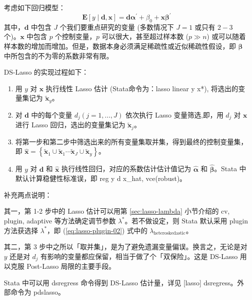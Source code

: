 考虑如下回归模型：
\begin{equation}\label{eq:Lasso-DS-01}
	\mathbf{E}[y \mid \mathbf{d}, \mathbf{x}]=\mathbf{d} \boldsymbol{\alpha}^{\prime}+\beta_{0}+\mathbf{x} \boldsymbol{\beta}^{\prime}
\end{equation}
其中，$\mathbf{d}$ 中包含 $J$ 个我们要重点研究的变量 (多数情况下 $J=1$ 或只有 $2-3$ 个)。$\mathbf{x}$ 中包含 $p$ 个控制变量，$p$ 可以很大，甚至超过样本数 ($p\gg n$) 或可以随着样本数的增加而增加。但是，数据本身必须满足稀疏性或近似稀疏性假设，即 $\boldsymbol{\beta}$ 中所包含的不为零的系数非常有限。


DS-Lasso 的实现过程如下：
\begin{enumerate}
\item 用 $y$ 对 $\mathbf{x}$ 执行线性 Lasso 估计 (Stata命令为：lasso linear y x*), 将选出的变量集记为 $\widetilde{\mathbf{x}}_{y}$。
\item 对 $\mathbf{d}$ 中的每个变量 $d_{j} (j=1, \ldots, J)$ 依次执行 Lasso 变量筛选,即，用 $d_{j}$ 对 $\mathbf{x}$ 进行 Lasso 回归，选出的变量集记为 $\widetilde{\mathbf{x}}_{j}$。
\item 将第一步和第二步中筛选出来的所有变量集取并集，得到最终的控制变量集，即  $\widehat{\mathbf{x}} = \left\{\widetilde{\mathbf{x}}_{1} \cup \widetilde{\mathbf{x}}_{1} \cdots \widetilde{\mathbf{x}}_{J} \cup \widetilde{\mathbf{x}}_{y}\right\}$。
\item 用 $y$ 对 $\mathbf{d}$ 和 $\widehat{\mathbf{x}}$ 执行线性回归，对应的系数估计估计值记为 $\widehat{\boldsymbol{\alpha}}$ 和 $\widehat{\boldsymbol{\beta}}$。Stata 中默认计算稳健性标准误，即 reg y d x\_hat, vce(robust)。
\end{enumerate}
补充两点说明：

其一，第 1-2 步中的 Lasso 估计可以用第 \ref{sec:lasso-lambda} 小节介绍的 cv, plugin, adaptive 等方法确定调节参数 $\lambda^*$。若不做设定，则 Stata 默认采用 plugin 方法获选择 $\lambda^*$，即 (\ref{eq:lasso-plugin-02}) 式中的 $\lambda_{\text {heteroskedastic}}$。

其二，第 3 步中之所以「取并集」，是为了避免遗漏变量偏误。换言之，无论是对 $y$ 还是对 $d_j$ 有影响的变量都应保留，相当于做了个「双保险」。这是 DS-Lasso 用以克服 Post-Lasso 局限的主要手段。
 


Stata 中可以用 dsregress 命令得到 DS-Lasso 估计量，详见 [lasso] dsregress。外部命令为 pdslasso。





